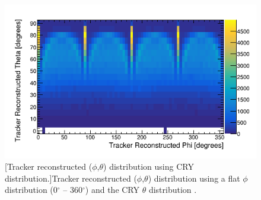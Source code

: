 \begin{figure}[!h]
 \centering
 \includegraphics[width=0.7\linewidth]{Chapter6/Figs/phiVsThetaCryReco.png}
 [Tracker reconstructed ($\phi$,$\theta$) distribution using CRY distribution.]{Tracker reconstructed ($\phi$,$\theta$) distribution using a flat $\phi$ distribution (0$^\circ$ -- 360$^\circ$) and the CRY $\theta$ distribution \cite{ieee_cry_2007}.}
 \label{fig:mc_PvsT}
\end{figure}

